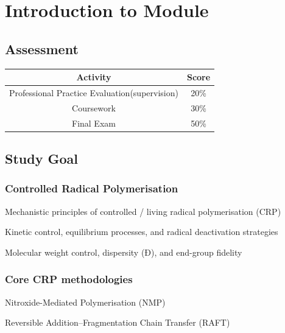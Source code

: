 \documentclass{NoteThesis/note-thesis}
\begin{document}
\maketitle

\tableofcontents

\newpage

\section{Introduction to Module}

\subsection*{Assessment}

\begin{table}[h]
    \centering
    \begin{tabular}{cc}
        \hline
        Activity & Score\\
        \hline
        Professional Practice Evaluation(supervision) & 20\%\\
        Coursework & 30\%\\
        Final Exam & 50\%\\ 
        \hline
    \end{tabular}
\end{table}

\subsection{Study Goal}

\subsubsection*{Controlled Radical Polymerisation}
Mechanistic principles of controlled / living radical polymerisation (CRP)

Kinetic control, equilibrium processes, and radical deactivation strategies

Molecular weight control, dispersity (Đ), and end-group fidelity

\subsubsection*{Core CRP methodologies}

Nitroxide-Mediated Polymerisation (NMP)

Reversible Addition–Fragmentation Chain Transfer (RAFT)
\end{document}
